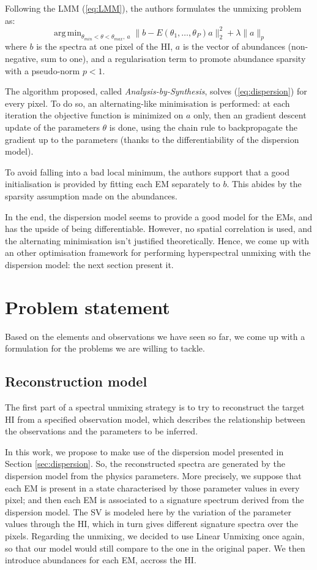 \documentclass{article}
\DeclareMathOperator*{\argmin}{arg\,min}
\begin{document}
Following the LMM (\ref{eq:LMM}), the authors formulates the unmixing problem as:
\begin{equation}\label{eq:dispersion}
  \argmin_{\theta_{min} < \theta < \theta_{max},\ a} \| b - E(\theta_1, \dots, \theta_P) a \|_2^2 + \lambda \| a \|_p
\end{equation}
where $b$ is the spectra at one pixel of the HI, $a$ is the vector of abundances (non-negative, sum to one), and a regularisation term to promote abundance sparsity with a pseudo-norm $p < 1$.

The algorithm proposed, called \emph{Analysis-by-Synthesis}, solves (\ref{eq:dispersion}) for every pixel. To do so, an alternating-like minimisation is performed: at each iteration the objective function is minimized on $a$ only, then an gradient descent update of the parameters $\theta$ is done, using the chain rule to backpropagate the gradient up to the parameters (thanks to the differentiability of the dispersion model).

To avoid falling into a bad local minimum, the authors support that a good initialisation is provided by fitting each EM separately to $b$. This abides by the sparsity assumption made on the abundances.

In the end, the dispersion model seems to provide a good model for the EMs, and has the upside of being differentiable. However, no spatial correlation is used, and the alternating minimisation isn't justified theoretically. Hence, we come up with an other optimisation framework for performing hyperspectral unmixing with the dispersion model: the next section present it.


\section{Problem statement}
Based on the elements and observations we have seen so far, we come up with a formulation for the problems we are willing to tackle.

\subsection{Reconstruction model}
The first part of a spectral unmixing strategy is to try to reconstruct the target HI from a specified observation model, which describes the relationship between the observations and the parameters to be inferred.

In this work, we propose to make use of the dispersion model presented in Section \ref{sec:dispersion}. So, the reconstructed spectra are generated by the dispersion model from the physics parameters. More precisely, we suppose that each EM is present in a state characterised by those parameter values in every pixel; and then each EM is associated to a signature spectrum derived from the dispersion model. The SV is modeled here by the variation of the parameter values through the HI, which in turn gives different signature spectra over the pixels. Regarding the unmixing, we decided to use Linear Unmixing once again, so that our model would still compare to the one in the original paper. We then introduce abundances for each EM, accross the HI.
\end{document}
